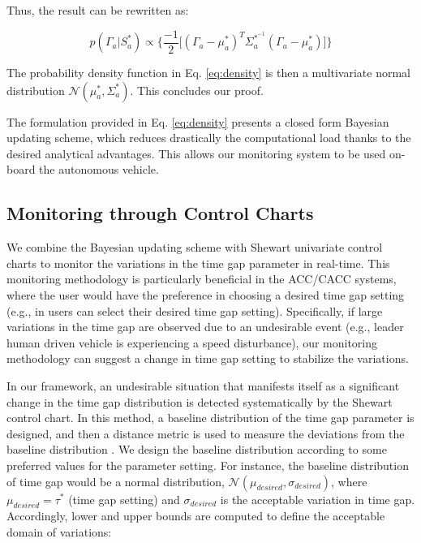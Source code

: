 \documentclass{article}
\begin{document}
Thus, the result can be rewritten as: 

\begin{equation}
\label{eq:density}
    p(\Gamma_a|S_a^*)\propto \Big\{\frac{-1}{2}\big[ (\Gamma_a - \mu_a^*)^T\Sigma_a^{*^{-1}}(\Gamma_a - \mu_a^*)\big]\Big\}
\end{equation}

The probability density function in Eq. \ref{eq:density} is then a multivariate normal distribution $\mathcal{N}(\mu_a^*, \Sigma_a^*)$. This concludes our proof. 

The formulation provided in Eq. \ref{eq:density} presents a closed form Bayesian updating scheme, which reduces drastically the computational load thanks to the desired analytical advantages. This allows our monitoring system to be used on-board the autonomous vehicle. 

\subsection{Monitoring through Control Charts}

We combine the Bayesian updating scheme with Shewart univariate control charts to monitor the variations in the time gap parameter in real-time. This monitoring methodology is particularly beneficial in the ACC/CACC systems, where the user would have the preference in choosing a desired time gap setting (e.g., in \cite{shladover2009effects} users can select their desired time gap setting). Specifically, if large variations in the time gap are observed due to an undesirable event (e.g., leader human driven vehicle is experiencing a speed disturbance), our monitoring methodology can suggest a change in time gap setting to stabilize the variations.

In our framework, an undesirable situation that manifests itself as a significant change in the time gap distribution is detected systematically by the Shewart control chart. In this method, a baseline distribution of the time gap parameter is designed, and then a distance metric is used to measure the deviations from the baseline distribution \cite{hsieh2006joint}. We design the baseline distribution according to some preferred values for the parameter setting. For instance, the baseline distribution of time gap would be a normal distribution, $\mathcal{N}(\mu_{desired}, \sigma_{desired})$, where $\mu_{desired} = \tau^*$ (time gap setting) and $\sigma_{desired}$ is the acceptable variation in time gap. Accordingly, lower and upper bounds are computed to define the acceptable domain of variations:
\end{document}
